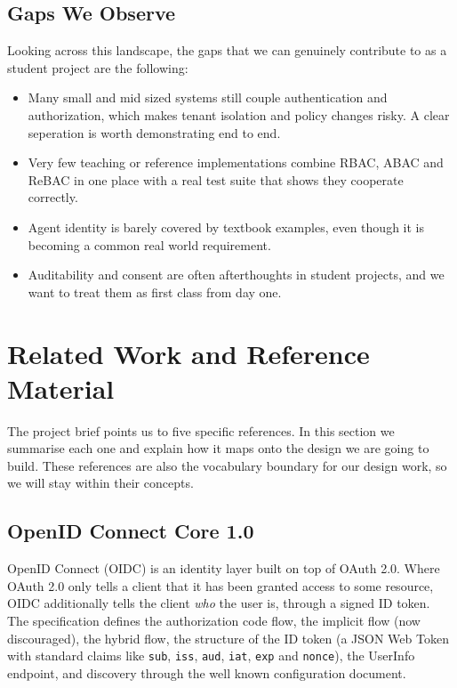 \documentclass[11pt,a4paper]{article}
\begin{document}
\subsection{Gaps We Observe}

Looking across this landscape, the gaps that we can genuinely contribute to as a student project are the following:

\begin{itemize}[leftmargin=1.5em,itemsep=2pt]
    \item Many small and mid sized systems still couple authentication and authorization, which makes tenant isolation and policy changes risky. A clear seperation is worth demonstrating end to end.
    \item Very few teaching or reference implementations combine RBAC, ABAC and ReBAC in one place with a real test suite that shows they cooperate correctly.
    \item Agent identity is barely covered by textbook examples, even though it is becoming a common real world requirement.
    \item Auditability and consent are often afterthoughts in student projects, and we want to treat them as first class from day one.
\end{itemize}

\section{Related Work and Reference Material}

The project brief points us to five specific references. In this section we summarise each one and explain how it maps onto the design we are going to build. These references are also the vocabulary boundary for our design work, so we will stay within their concepts.

\subsection{OpenID Connect Core 1.0}

OpenID Connect (OIDC) is an identity layer built on top of OAuth 2.0. Where OAuth 2.0 only tells a client that it has been granted access to some resource, OIDC additionally tells the client \textit{who} the user is, through a signed ID token. The specification defines the authorization code flow, the implicit flow (now discouraged), the hybrid flow, the structure of the ID token (a JSON Web Token with standard claims like \texttt{sub}, \texttt{iss}, \texttt{aud}, \texttt{iat}, \texttt{exp} and \texttt{nonce}), the UserInfo endpoint, and discovery through the well known configuration document.
\end{document}
